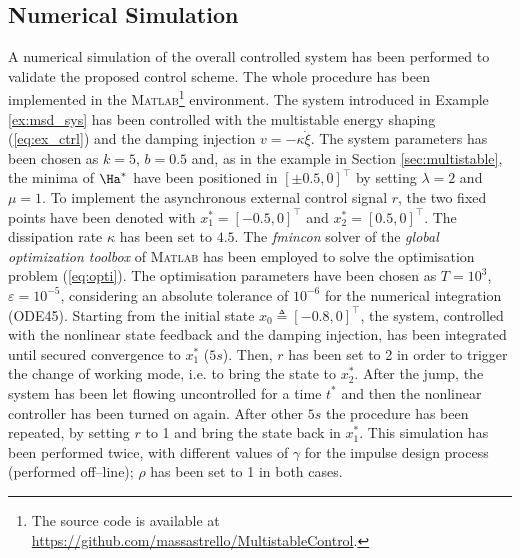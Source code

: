 \subsection{Numerical Simulation}
%
A numerical simulation of the overall controlled system has been performed to validate the proposed control scheme. The whole procedure has been implemented in the \textsc{Matlab}\textsuperscript{\textregistered}\footnote{The source code is available at \url{https://github.com/massastrello/MultistableControl}.} environment. The system introduced in Example \ref{ex:msd_sys} has been controlled with the multistable energy shaping (\ref{eq:ex_ctrl}) and the damping injection $v = -\kappa\dot{\xi}$. The system parameters has been chosen as $k = 5$, $b = 0.5$ and, as in the example in Section \ref{sec:multistable}, the minima of $\Ha^*$ have been positioned in $[\pm 0.5,0]^\top$ by setting $\lambda = 2$ and $\mu = 1$.
{%
To implement the asynchronous external control signal $r$, the two fixed points have been denoted with $x_1^* = [-0.5,0]^\top$ and $x_2^* = [0.5,0]^\top$.}
The dissipation rate $\kappa$ has been set to $4.5$. 
The \textit{fmincon} solver of the \textit{global optimization toolbox} of \textsc{Matlab}\textsuperscript{\textregistered} has been employed to solve the optimisation problem (\ref{eq:opti}). The optimisation parameters have been chosen as $T=10^3$, $\varepsilon=10^{-5}$, considering an absolute tolerance of $10^{-6}$ for the numerical integration (ODE45).
Starting from the initial state $x_0 \triangleq [-0.8,0]^\top$, the system, controlled with the nonlinear state feedback and the damping injection, has been integrated until secured convergence to $x_1^*$ ($5s$). Then, $r$ has been set to 2 in order to trigger the change of working mode, i.e. to bring the state to $x_2^*$. After the jump, the system has been let flowing uncontrolled for a time $t^*$ and then the nonlinear controller has been turned on again. After other $5s$ the procedure has been repeated, by setting $r$ to 1 and bring the state back in $x_1^*$.
This simulation has been performed twice, with different values of $\gamma$ for the impulse design process (performed off--line); $\rho$ has been set to 1 in both cases. 

